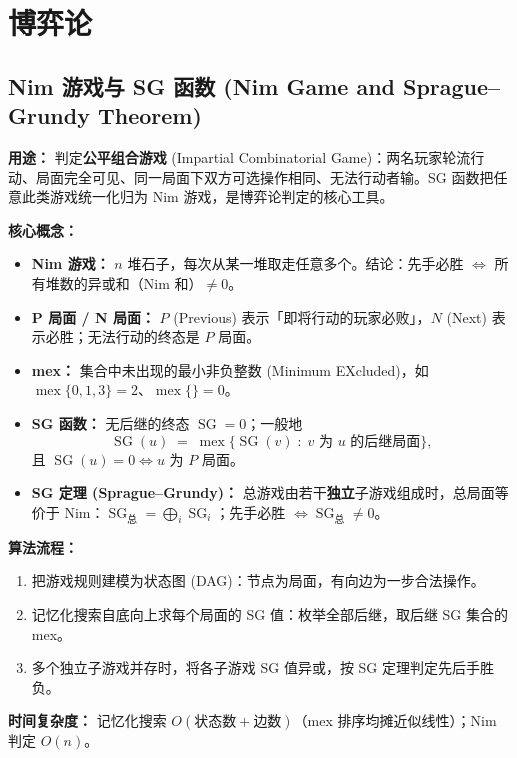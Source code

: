 \section{博弈论}


\subsection{Nim 游戏与 SG 函数 (Nim Game and Sprague--Grundy Theorem)}

\textbf{用途：}
判定\textbf{公平组合游戏} (Impartial Combinatorial Game)：两名玩家轮流行动、局面完全可见、同一局面下双方可选操作相同、无法行动者输。SG 函数把任意此类游戏统一化归为 Nim 游戏，是博弈论判定的核心工具。

\textbf{核心概念：}
\begin{itemize}
    \item \textbf{Nim 游戏：} $n$ 堆石子，每次从某一堆取走任意多个。结论：先手必胜 $\iff$ 所有堆数的异或和（Nim 和）$\ne 0$。
    \item \textbf{P 局面 / N 局面：} $P$ (Previous) 表示「即将行动的玩家必败」，$N$ (Next) 表示必胜；无法行动的终态是 $P$ 局面。
    \item \textbf{mex：} 集合中未出现的最小非负整数 (Minimum EXcluded)，如 $\operatorname{mex}\{0,1,3\}=2$、$\operatorname{mex}\{\}=0$。
    \item \textbf{SG 函数：} 无后继的终态 $\operatorname{SG}=0$；一般地
    \[ \operatorname{SG}(u) \;=\; \operatorname{mex}\{\operatorname{SG}(v) \;:\; v \text{ 为 } u \text{ 的后继局面}\}, \]
    且 $\operatorname{SG}(u)=0 \iff u$ 为 $P$ 局面。
    \item \textbf{SG 定理 (Sprague--Grundy)：} 总游戏由若干\textbf{独立}子游戏组成时，总局面等价于 Nim：$\operatorname{SG}_{\text{总}}=\bigoplus_i \operatorname{SG}_i$；先手必胜 $\iff \operatorname{SG}_{\text{总}}\ne 0$。
\end{itemize}

\textbf{算法流程：}
\begin{enumerate}
    \item 把游戏规则建模为状态图 (DAG)：节点为局面，有向边为一步合法操作。
    \item 记忆化搜索自底向上求每个局面的 SG 值：枚举全部后继，取后继 SG 集合的 mex。
    \item 多个独立子游戏并存时，将各子游戏 SG 值异或，按 SG 定理判定先后手胜负。
\end{enumerate}

\textbf{时间复杂度：} 记忆化搜索 $O(\text{状态数}+\text{边数})$（mex 排序均摊近似线性）；Nim 判定 $O(n)$。

